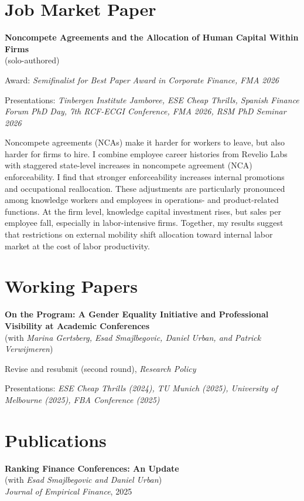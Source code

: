 \documentclass[11pt,letterpaper]{article}
\newenvironment{cvbody}{\begin{list}{}{\setlength{\leftmargin}{1.4em}\setlength{\rightmargin}{0pt}\setlength{\topsep}{0pt}\setlength{\parsep}{4pt}}\item[]}{\end{list}}
\begin{document}
\section*{Job Market Paper}
\begin{cvbody}
\textbf{Noncompete Agreements and the Allocation of Human Capital Within Firms}\\
(solo-authored)

Award: \textit{Semifinalist for Best Paper Award in Corporate Finance, FMA 2026}

Presentations: \textit{Tinbergen Institute Jamboree, ESE Cheap Thrills, Spanish Finance Forum PhD Day, 7th RCF-ECGI Conference, FMA 2026, RSM PhD Seminar 2026}

Noncompete agreements (NCAs) make it harder for workers to leave, but also
harder for firms to hire. I combine employee career histories from Revelio Labs with
staggered state-level increases in noncompete agreement (NCA) enforceability. I find
that stronger enforceability increases internal promotions and occupational reallocation. These adjustments are particularly pronounced among knowledge workers and
employees in operations- and product-related functions. At the firm level, knowledge
capital investment rises, but sales per employee fall, especially in labor-intensive firms. Together, my results suggest that restrictions on external mobility shift allocation toward internal labor market at the cost of labor productivity.
\end{cvbody}

\section*{Working Papers}
\begin{cvbody}
\textbf{On the Program: A Gender Equality Initiative and Professional Visibility at Academic Conferences}\\
(with \textit{Marina Gertsberg, Esad Smajlbegovic, Daniel Urban, and Patrick Verwijmeren})

Revise and resubmit (second round), \textit{Research Policy}

Presentations: \textit{ESE Cheap Thrills (2024), TU Munich (2025), University of Melbourne (2025), FBA Conference (2025)}
\end{cvbody}




\section*{Publications}
\begin{cvbody}
\textbf{Ranking Finance Conferences: An Update}\\
(with \textit{Esad Smajlbegovic and Daniel Urban})\\
\textit{Journal of Empirical Finance}, 2025
\end{cvbody}
\end{document}
